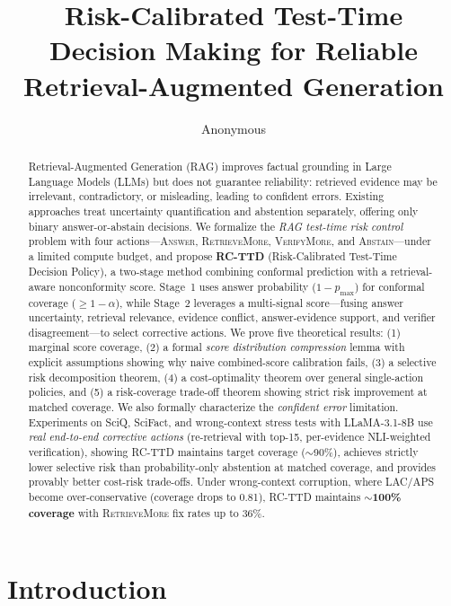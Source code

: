 \documentclass[letterpaper]{article}
\title{Risk-Calibrated Test-Time Decision Making for Reliable Retrieval-Augmented Generation}
\author{Anonymous}
\begin{document}
\maketitle

\begin{abstract}
Retrieval-Augmented Generation (RAG) improves factual grounding in Large Language Models (LLMs) but does not guarantee reliability: retrieved evidence may be irrelevant, contradictory, or misleading, leading to confident errors. Existing approaches treat uncertainty quantification and abstention separately, offering only binary answer-or-abstain decisions. We formalize the \emph{RAG test-time risk control} problem with four actions---\textsc{Answer}, \textsc{RetrieveMore}, \textsc{VerifyMore}, and \textsc{Abstain}---under a limited compute budget, and propose \textbf{RC-TTD} (Risk-Calibrated Test-Time Decision Policy), a two-stage method combining conformal prediction with a retrieval-aware nonconformity score. Stage~1 uses answer probability ($1{-}p_{\max}$) for conformal coverage ($\geq 1{-}\alpha$), while Stage~2 leverages a multi-signal score---fusing answer uncertainty, retrieval relevance, evidence conflict, answer-evidence support, and verifier disagreement---to select corrective actions. We prove five theoretical results: (1) marginal score coverage, (2) a formal \emph{score distribution compression} lemma with explicit assumptions showing why naive combined-score calibration fails, (3) a selective risk decomposition theorem, (4) a cost-optimality theorem over general single-action policies, and (5) a risk-coverage trade-off theorem showing strict risk improvement at matched coverage. We also formally characterize the \emph{confident error} limitation. Experiments on SciQ, SciFact, and wrong-context stress tests with LLaMA-3.1-8B use \emph{real end-to-end corrective actions} (re-retrieval with top-15, per-evidence NLI-weighted verification), showing RC-TTD maintains target coverage ($\sim$90\%), achieves strictly lower selective risk than probability-only abstention at matched coverage, and provides provably better cost-risk trade-offs. Under wrong-context corruption, where LAC/APS become over-conservative (coverage drops to 0.81), RC-TTD maintains \textbf{$\sim$100\% coverage} with \textsc{RetrieveMore} fix rates up to 36\%.
\end{abstract}

\section{Introduction}
\end{document}
